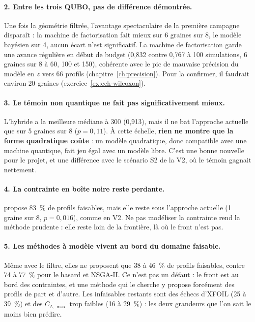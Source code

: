 \paragraph{2. Entre les trois QUBO, pas de différence démontrée.} Une fois la géométrie filtrée, l'avantage spectaculaire de la première campagne disparaît : la machine de factorisation fait mieux sur 6 graines sur 8, le modèle bayésien sur 4, aucun écart n'est significatif. La machine de factorisation garde une avance régulière en début de budget (0,832 contre 0,767 à 100 simulations, 6 graines sur 8 à 60, 100 et 150), cohérente avec le pic de mauvaise précision du modèle en $z$ vers 66 profils (chapitre~\ref{ch:precision}). Pour la confirmer, il faudrait environ 20 graines (exercice~\ref{ex:ech-wilcoxon}).

\paragraph{3. Le témoin non quantique ne fait pas significativement mieux.} L'hybride a la meilleure médiane à 300 (0,913), mais il ne bat l'approche actuelle que sur 5 graines sur 8 ($p=0{,}11$). À cette échelle, \textbf{rien ne montre que la forme quadratique coûte} : un modèle quadratique, donc compatible avec une machine quantique, fait jeu égal avec un modèle libre. C'est une bonne nouvelle pour le projet, et une différence avec le scénario S2 de la V2, où le témoin gagnait nettement.

\paragraph{4. La contrainte en boîte noire reste perdante.}  propose 83~\% de profils faisables, mais elle reste sous l'approche actuelle (1 graine sur 8, $p=0{,}016$), comme en V2. Ne pas modéliser la contrainte rend la méthode prudente : elle reste loin de la frontière, là où le front n'est pas.

\paragraph{5. Les méthodes à modèle vivent au bord du domaine faisable.} Même avec le filtre, elles ne proposent que 38 à 46~\% de profils faisables, contre 74 à 77~\% pour le hasard et NSGA-II. Ce n'est pas un défaut : le front est au bord des contraintes, et une méthode qui le cherche y propose forcément des profils de part et d'autre. Les infaisables restants sont des échecs d'XFOIL (25 à 39~\%) et des $C_{L,\max}$ trop faibles (16 à 29~\%) : les deux grandeurs que l'on sait le moins bien prédire.

